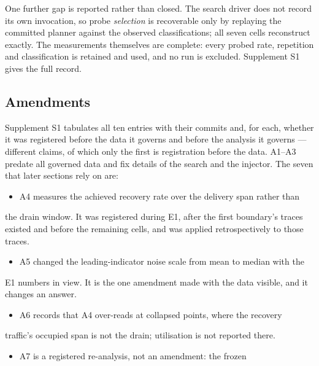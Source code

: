 \documentclass{ieeeaccess}
\begin{document}
One further gap is reported rather than closed. The search driver does not record its own invocation, so probe \textit{selection} is recoverable only by replaying the committed planner against the observed classifications; all seven cells reconstruct exactly. The measurements themselves are complete: every probed rate, repetition and classification is retained and used, and no run is excluded. Supplement S1 gives the full record.

\subsection{Amendments}

Supplement S1 tabulates all ten entries with their commits and, for each, whether it was registered before the data it governs and before the analysis it governs --- different claims, of which only the first is registration before the data. A1--A3 predate all governed data and fix details of the search and the injector. The seven that later sections rely on are:

\begin{itemize}
\item A4 measures the achieved recovery rate over the delivery span rather than
\end{itemize}

the drain window. It was registered during E1, after the first boundary's traces existed and before the remaining cells, and was applied retrospectively to those traces.

\begin{itemize}
\item A5 changed the leading-indicator noise scale from mean to median with the
\end{itemize}

E1 numbers in view. It is the one amendment made with the data visible, and it changes an answer.

\begin{itemize}
\item A6 records that A4 over-reads at collapsed points, where the recovery
\end{itemize}

traffic's occupied span is not the drain; utilisation is not reported there.

\begin{itemize}
\item A7 is a registered re-analysis, not an amendment: the frozen
\end{itemize}
\end{document}
